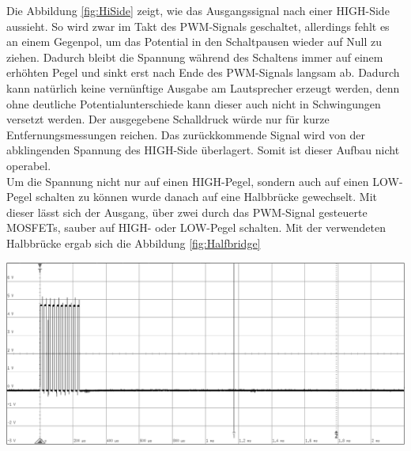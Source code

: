 Die Abbildung \ref{fig:HiSide} zeigt, wie das Ausgangssignal nach einer HIGH-Side aussieht. So wird zwar im Takt des PWM-Signals geschaltet, allerdings fehlt es an einem Gegenpol, um das Potential in den Schaltpausen wieder auf Null zu ziehen. Dadurch bleibt die Spannung während des Schaltens immer auf einem erhöhten Pegel und sinkt erst nach Ende des PWM-Signals langsam ab. Dadurch kann natürlich keine vernünftige Ausgabe am Lautsprecher erzeugt werden, denn ohne deutliche Potentialunterschiede kann dieser auch nicht in Schwingungen versetzt werden. Der ausgegebene Schalldruck würde nur für kurze Entfernungsmessungen reichen. Das zurückkommende Signal wird von der abklingenden Spannung des HIGH-Side überlagert. Somit ist dieser Aufbau nicht operabel.\\
Um die Spannung nicht nur auf einen HIGH-Pegel, sondern auch auf einen LOW-Pegel schalten zu können wurde danach auf eine Halbbrücke gewechselt. Mit dieser lässt sich der Ausgang, über zwei durch das PWM-Signal gesteuerte MOSFETs, sauber auf HIGH- oder LOW-Pegel schalten. %
Mit der verwendeten Halbbrücke ergab sich die Abbildung \ref{fig:Halfbridge}\\
\begin{minipage}{0.5\textwidth}
\includegraphics[width=1\textwidth%
]{Abbildungen/MessungenP1/PWM-Nach-der-Halbbrucke.png}
\label{fig:Halfbridge}
\end{minipage}
